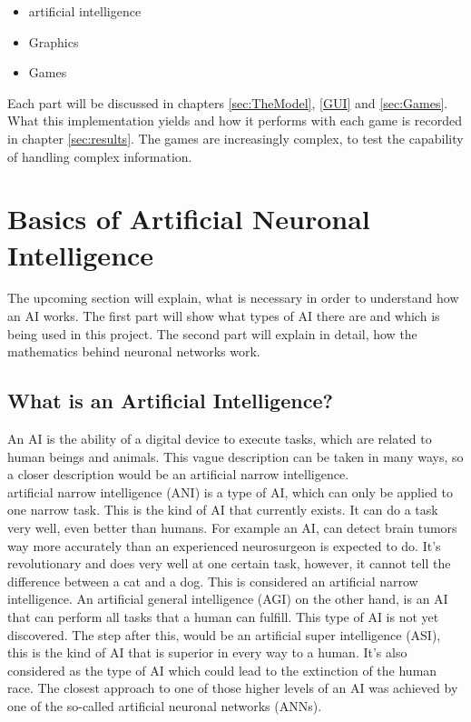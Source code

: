 \documentclass[12pt]{article}
\begin{document}
\begin{itemize}
    \item \Gls{artificial intelligence}
    \item Graphics
    \item Games
\end{itemize}
Each part will be discussed in chapters \ref{sec:TheModel}, \ref{GUI} and \ref{sec:Games}. What this implementation yields and how it performs with each game is recorded in chapter \ref{sec:results}. The games are increasingly complex, to test the capability of handling complex information.
\section{Basics of Artificial Neuronal Intelligence}\label{basics}
The upcoming section will explain, what is necessary in order to understand how an AI works. The first part will show what types of AI there are and which is being used in this project. The second part will explain in detail, how the mathematics behind neuronal networks work.
\subsection{What is an Artificial Intelligence?}
An \gls{AI} is the ability of a digital device to execute tasks, which are related to human beings and animals. This vague description can be taken in many ways, so a closer description would be an \gls{artificial narrow intelligence}. \cite{aibritannica}\\
\Gls{artificial narrow intelligence} (ANI) is a type of \gls{AI}, which can only be applied to one narrow task. This is the kind of \gls{AI} that currently exists. It can do a task very well, even better than humans. For example an \gls{AI}, can detect brain tumors way more accurately than an experienced neurosurgeon is expected to do. It's revolutionary and does very well at one certain task, however, it cannot tell the difference between a cat and a dog. This is considered an \gls{artificial narrow intelligence}. An \gls{artificial general intelligence} (AGI) on the other hand, is an \gls{AI} that can perform all tasks that a human can fulfill. This type of \gls{AI} is not yet discovered. The step after this, would be an \gls{artificial super intelligence} (ASI), this is the kind of \gls{AI} that is superior in every way to a human. It's also considered as the type of \gls{AI} which could lead to the extinction of the human race. The closest approach to one of those higher levels of an \gls{AI} was achieved by one of the so-called artificial \glspl{neuronal network} (\glspl{ANN}).
\cite{narrowAI} 
\end{document}
